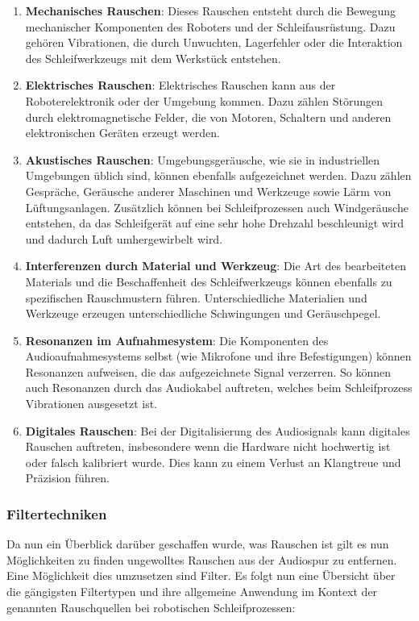 \begin{enumerate}
    \item \textbf{Mechanisches Rauschen}: Dieses Rauschen entsteht durch die Bewegung mechanischer Komponenten des Roboters und der Schleifausrüstung. Dazu gehören Vibrationen, die durch Unwuchten, Lagerfehler oder die Interaktion des Schleifwerkzeugs mit dem Werkstück entstehen. \cite{xiang2023}
    
    \item \textbf{Elektrisches Rauschen}: Elektrisches Rauschen kann aus der Roboterelektronik oder der Umgebung kommen. Dazu zählen Störungen durch elektromagnetische Felder, die von Motoren, Schaltern und anderen elektronischen Geräten erzeugt werden. \cite{xiang2023}
    
    \item \textbf{Akustisches Rauschen}: Umgebungsgeräusche, wie sie in industriellen Umgebungen üblich sind, können ebenfalls aufgezeichnet werden. Dazu zählen Gespräche, Geräusche anderer Maschinen und Werkzeuge sowie Lärm von Lüftungsanlagen. Zusätzlich können bei Schleifprozessen auch Windgeräusche entstehen, da das Schleifgerät auf eine sehr hohe Drehzahl beschleunigt wird und dadurch Luft umhergewirbelt wird. \cite{xiang2023}
    
    \item \textbf{Interferenzen durch Material und Werkzeug}: Die Art des bearbeiteten Materials und die Beschaffenheit des Schleifwerkzeugs können ebenfalls zu spezifischen Rauschmustern führen. Unterschiedliche Materialien und Werkzeuge erzeugen unterschiedliche Schwingungen und Geräuschpegel. \cite{plos2021}
    
    \item \textbf{Resonanzen im Aufnahmesystem}: Die Komponenten des Audioaufnahmesystems selbst (wie Mikrofone und ihre Befestigungen) können Resonanzen aufweisen, die das aufgezeichnete Signal verzerren. So können auch Resonanzen durch das Audiokabel auftreten, welches beim Schleifprozess Vibrationen ausgesetzt ist.
    
    \item \textbf{Digitales Rauschen}: Bei der Digitalisierung des Audiosignals kann digitales Rauschen auftreten, insbesondere wenn die Hardware nicht hochwertig ist oder falsch kalibriert wurde. Dies kann zu einem Verlust an Klangtreue und Präzision führen. \cite{plos2021}
    
\end{enumerate}

\subsubsection{Filtertechniken}
Da nun ein Überblick darüber geschaffen wurde, was Rauschen ist gilt es nun Möglichkeiten zu finden ungewolltes Rauschen aus der Audiospur zu entfernen. Eine Möglichkeit dies umzusetzen sind Filter.  Es folgt nun eine Übersicht über die gängigsten Filtertypen und ihre allgemeine Anwendung im Kontext der genannten Rauschquellen bei robotischen Schleifprozessen:

